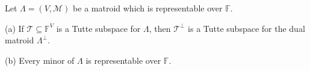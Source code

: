 Let $\Lambda = (V, \mathcal{M})$ be a matroid which is representable over $\mathbb{F}$.

(a) If $\mathcal{T} \subseteq \mathbb{F}^V$ is a Tutte subspace for $\Lambda$, then $\mathcal{T}^\perp$ is a Tutte subspace for the dual matroid $\Lambda^\perp$.

(b) Every minor of $\Lambda$ is representable over $\mathbb{F}$.
